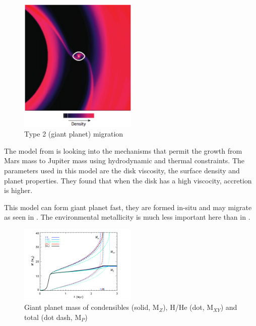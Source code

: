 \documentclass[12pt]{article} %
\begin{document}
\begin{figure}
\begin{center}
 \includegraphics[width=0.5\textwidth,keepaspectratio=true]{./images/chambers2009}
 \caption{Type 2 (giant planet) migration \cite{chambers2009planetary}}
 \label{chambers2009}
\end{center}
\end{figure}


\noindent The model from \cite{lissauer2009models} is looking into the mechanisms that permit the growth from Mars mass to Jupiter mass using hydrodynamic and thermal constraints. The parameters used in this model are the disk viscosity, the surface density and planet properties. They found that when the disk has a high viscocity, accretion is higher.\newline

\noindent This model can form giant planet fast, they are formed in-situ and may migrate as seen in \cite{chambers2009planetary}. The environmental metallicity is much less important here than in \cite{pollack1996formation}.\newline
\clearpage

\begin{figure}
\begin{center}
 \includegraphics[width=0.5\textwidth,keepaspectratio=true]{./images/lissauer2014}
 \caption{Giant planet mass of condensibles (solid, M$_Z$), H/He (dot, M$_{XY}$) and total (dot dash, M$_P$)  \cite{lissauer2009models}}
 \label{lissauer2014}
\end{center}
\end{figure}
\end{document}
